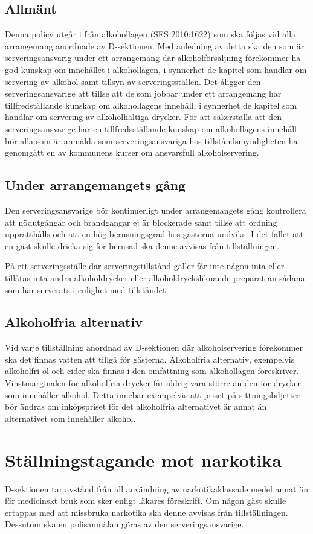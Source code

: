 \documentclass[]{dsekprotokoll}
\begin{document}
\subsection{Allmänt}
Denna policy utgår i från alkohollagen (SFS 2010:1622) som ska följas vid alla arrangemang anordnade av D-sektionen. Med anledning av detta ska den som är serveringsansvarig under ett arrangemang där alkoholförsäljning förekommer ha god kunskap om innehållet i alkohollagen, i synnerhet de kapitel som handlar om servering av alkohol samt tillsyn av serveringsställen. Det åligger den serveringsansvarige att tillse att de som jobbar under ett arrangemang har tillfredställande kunskap om alkohollagens innehåll, i synnerhet de kapitel som handlar om servering av alkoholhaltiga drycker. För att säkerställa att den serveringsansvarige har en tillfredsställande kunskap om alkohollagens innehåll bör alla som är anmälda som serveringsansvariga hos tillståndsmyndigheten ha genomgått en av kommunens kurser om ansvarsfull alkoholservering.

\subsection{Under arrangemangets gång}
Den serveringsansvarige bör kontinuerligt under arrangemangets gång kontrollera att nödutgångar och brandgångar ej är blockerade samt tillse att ordning upprätthålls och att en hög berusningsgrad hos gästerna undviks. I det fallet att en gäst skulle dricka sig för berusad ska
denne avvisas från tillställningen. 

På ett serveringsställe där serveringstillstånd gäller får inte någon inta eller tillåtas inta andra alkoholdrycker eller alkoholdrycksliknande preparat än sådana som har serverats i enlighet med tillståndet.

\subsection{Alkoholfria alternativ}
Vid varje tillställning anordnad av D-sektionen där alkoholservering förekommer ska det finnas vatten att tillgå för gästerna. Alkoholfria alternativ, exempelvis alkoholfri öl och cider ska finnas i den omfattning som alkohollagen föreskriver. Vinstmarginalen för alkoholfria drycker får aldrig vara större än den för drycker som innehåller alkohol. Detta innebär exempelvis att priset på sittningsbiljetter bör ändras om inköpspriset för det alkoholfria alternativet är annat än alternativet som innehåller alkohol.

\section{Ställningstagande mot narkotika}
D-sektionen tar avstånd från all användning av narkotikaklassade medel annat än för medicinskt bruk som sker enligt läkares föreskrift. Om någon gäst skulle ertappas med att missbruka narkotika ska denne avvisas från tillställningen. Dessutom ska en polisanmälan göras av den serveringsansvarige.
\end{document}
